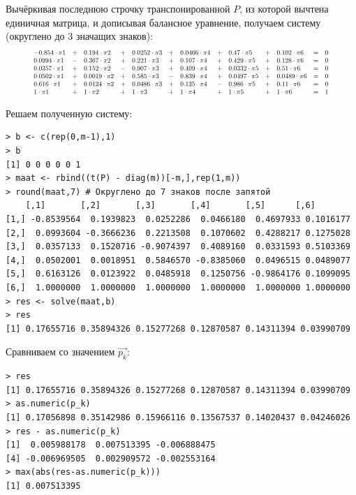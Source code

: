 \documentclass[14pt,a4paper]{scrartcl}
\begin{document}
Вычёркивая последнюю строчку транспонированной $P$, из которой вычтена единичная матрица, и дописывая балансное уравнение, получаем систему (округлено до 3 значащих знаков):
\begin{equation*}
	\resizebox{0.91\hsize}{!}
	{
		$\begin{array}{lllllllllllll}
		-0.854 \cdot \pi1  &+& 0.194 \cdot \pi2 &+& 0.0252 \cdot \pi3 &+& 0.0466 \cdot \pi4   &+& 0.47 \cdot \pi5  &+& 0.102 \cdot \pi6  &=&  0 \\ 
		0.0994 \cdot \pi1  &-& 0.367 \cdot \pi2  &+& 0.221 \cdot \pi3  &+& 0.107 \cdot \pi4  &+& 0.429 \cdot \pi5  &+& 0.128 \cdot \pi6  &=&  0 \\ 
		0.0357 \cdot \pi1  &+& 0.152 \cdot \pi2  &-& 0.907 \cdot \pi3  &+& 0.409 \cdot \pi4 &+& 0.0332 \cdot \pi5   &+& 0.51 \cdot \pi6  &=&  0 \\ 
		0.0502 \cdot \pi1 &+& 0.0019 \cdot \pi2  &+& 0.585 \cdot \pi3  &-& 0.839 \cdot \pi4 &+& 0.0497 \cdot \pi5 &+& 0.0489 \cdot \pi6  &=&  0 \\ 
		0.616 \cdot \pi1 &+& 0.0124 \cdot \pi2 &+& 0.0486 \cdot \pi3  &+& 0.125 \cdot \pi4  &-& 0.986 \cdot \pi5   &+& 0.11 \cdot \pi6  &=&  0 \\ 
		1 \cdot \pi1      &+& 1 \cdot \pi2      &+& 1 \cdot \pi3      &+& 1 \cdot \pi4      &+& 1 \cdot \pi5      &+& 1 \cdot \pi6  &=&  1 \\ 
		\end{array}$
	}
\end{equation*}

Решаем полученную систему:


\begin{verbatim}
> b <- c(rep(0,m-1),1)
> b
[1] 0 0 0 0 0 1
> maat <- rbind((t(P) - diag(m))[-m,],rep(1,m))
> round(maat,7) # Округлено до 7 знаков после запятой
	[,1]       [,2]       [,3]       [,4]       [,5]      [,6]
[1,] -0.8539564  0.1939823  0.0252286  0.0466180  0.4697933 0.1016177
[2,]  0.0993604 -0.3666236  0.2213508  0.1070602  0.4288217 0.1275028
[3,]  0.0357133  0.1520716 -0.9074397  0.4089160  0.0331593 0.5103369
[4,]  0.0502001  0.0018951  0.5846570 -0.8385060  0.0496515 0.0489077
[5,]  0.6163126  0.0123922  0.0485918  0.1250756 -0.9864176 0.1099095
[6,]  1.0000000  1.0000000  1.0000000  1.0000000  1.0000000 1.0000000
> res <- solve(maat,b)
> res
[1] 0.17655716 0.35894326 0.15277268 0.12870587 0.14311394 0.03990709
\end{verbatim}

\pagebreak
Сравниваем со значением $\vec{p_k}$:
\begin{verbatim}
> res
[1] 0.17655716 0.35894326 0.15277268 0.12870587 0.14311394 0.03990709
> as.numeric(p_k)
[1] 0.17056898 0.35142986 0.15966116 0.13567537 0.14020437 0.04246026
> res - as.numeric(p_k)
[1]  0.005988178  0.007513395 -0.006888475
[4] -0.006969505  0.002909572 -0.002553164
> max(abs(res-as.numeric(p_k)))
[1] 0.007513395
\end{verbatim}
\end{document}
